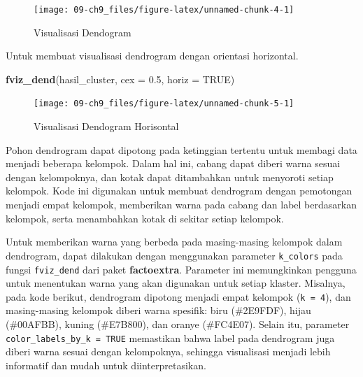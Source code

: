 \documentclass[
  oneside]{book}
\newenvironment{Shaded}{\begin{snugshade}}{\end{snugshade}}
\newcommand{\AttributeTok}[1]{\textcolor[rgb]{0.13,0.29,0.53}{#1}}
\newcommand{\ConstantTok}[1]{\textcolor[rgb]{0.56,0.35,0.01}{#1}}
\newcommand{\FloatTok}[1]{\textcolor[rgb]{0.00,0.00,0.81}{#1}}
\newcommand{\FunctionTok}[1]{\textcolor[rgb]{0.13,0.29,0.53}{\textbf{#1}}}
\newcommand{\NormalTok}[1]{#1}
\begin{document}
\begin{figure}[h]

{\centering \texttt{[image: 09-ch9\_files/figure-latex/unnamed-chunk-4-1]} 

}

\caption{Visualisasi Dendogram}\label{fig:unnamed-chunk-4}
\end{figure}

Untuk membuat visualisasi dendrogram dengan orientasi horizontal.

\begin{Shaded}
\begin{Highlighting}[]
\FunctionTok{fviz\_dend}\NormalTok{(hasil\_cluster, }\AttributeTok{cex =} \FloatTok{0.5}\NormalTok{, }\AttributeTok{horiz =} \ConstantTok{TRUE}\NormalTok{)}
\end{Highlighting}
\end{Shaded}

\begin{figure}[h]

{\centering \texttt{[image: 09-ch9\_files/figure-latex/unnamed-chunk-5-1]} 

}

\caption{Visualisasi Dendogram Horisontal}\label{fig:unnamed-chunk-5}
\end{figure}

Pohon dendrogram dapat dipotong pada ketinggian tertentu untuk membagi data menjadi beberapa kelompok. Dalam hal ini, cabang dapat diberi warna sesuai dengan kelompoknya, dan kotak dapat ditambahkan untuk menyoroti setiap kelompok. Kode ini digunakan untuk membuat dendrogram dengan pemotongan menjadi empat kelompok, memberikan warna pada cabang dan label berdasarkan kelompok, serta menambahkan kotak di sekitar setiap kelompok.

Untuk memberikan warna yang berbeda pada masing-masing kelompok dalam dendrogram, dapat dilakukan dengan menggunakan parameter \texttt{k\_colors} pada fungsi \texttt{fviz\_dend} dari paket \textbf{factoextra}. Parameter ini memungkinkan pengguna untuk menentukan warna yang akan digunakan untuk setiap klaster. Misalnya, pada kode berikut, dendrogram dipotong menjadi empat kelompok (\texttt{k\ =\ 4}), dan masing-masing kelompok diberi warna spesifik: biru (\#2E9FDF), hijau (\#00AFBB), kuning (\#E7B800), dan oranye (\#FC4E07). Selain itu, parameter \texttt{color\_labels\_by\_k\ =\ TRUE} memastikan bahwa label pada dendrogram juga diberi warna sesuai dengan kelompoknya, sehingga visualisasi menjadi lebih informatif dan mudah untuk diinterpretasikan.
\end{document}
